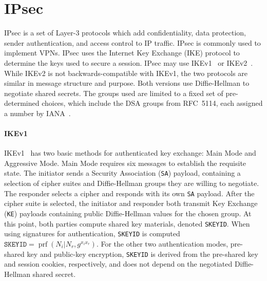 
\section{IPsec}


IPsec is a set of Layer-3 protocols which add confidentiality, data protection,
sender authentication, and access control to IP traffic. IPsec is commonly used
to implement VPNs.
IPsec uses the Internet Key Exchange (IKE) protocol to determine the keys used
to secure a session. IPsec may use IKEv1~\cite{rfc2409} or
IKEv2~\cite{rfc7296}. While IKEv2 is not backwards-compatible with IKEv1, the
two protocols are similar in message structure and purpose. Both versions use
Diffie-Hellman to negotiate shared secrets. The groups used are limited to a
fixed set of pre-determined choices, which include the DSA groups from
RFC~5114, each assigned a number by IANA~\cite{rfc3526,rfc5114,rfc7296}.

\paragraph{IKEv1}
IKEv1~\cite{rfc2407,rfc2408,rfc2409} has two basic methods for authenticated
key exchange: Main Mode and Aggressive Mode. Main Mode requires six messages to
establish the requisite state. The initiator sends a Security Association
(\texttt{SA}) payload, containing a selection of cipher suites and
Diffie-Hellman groups they are willing to negotiate. The responder selects a
cipher and responds with its own \texttt{SA} payload. After the cipher suite is
selected, the initiator and responder both transmit Key Exchange (\texttt{KE})
payloads containing public Diffie-Hellman values for the chosen group. At this
point, both parties compute shared key materials, denoted \texttt{SKEYID}. When
using signatures for authentication, \texttt{SKEYID} is computed
$\texttt{SKEYID} = \operatorname{prf}(N_i | N_r, g^{x_ix_r})$.  For the other
two authentication modes, pre-shared key and public-key encryption,
\texttt{SKEYID} is derived from the pre-shared key and session cookies,
respectively, and does not depend on the negotiated Diffie-Hellman shared
secret.

